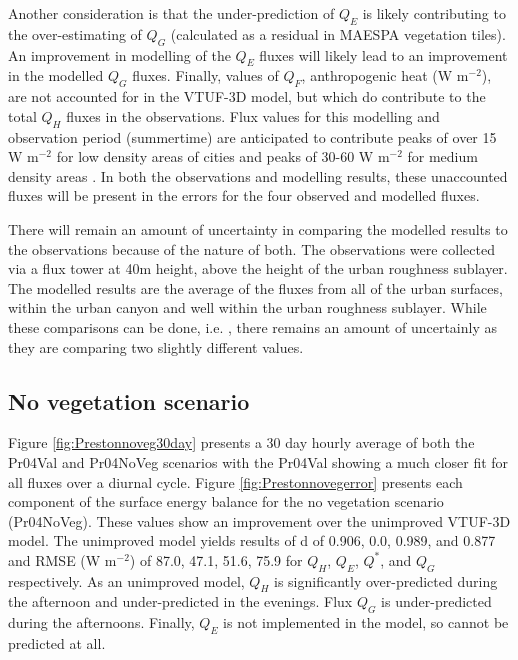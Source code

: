 \documentclass[final,3p,times,authoryear]{elsarticle}
\begin{document}
Another consideration is that the under-prediction of $Q_{E}$ is likely contributing to the over-estimating of $Q_{G}$ (calculated as a residual in MAESPA vegetation tiles). An improvement in modelling of the $Q_{E}$ fluxes will likely lead to an improvement in the modelled $Q_{G}$ fluxes. Finally, values of $Q_{F}$, anthropogenic heat (W m$^{-2}$), are not accounted for in the VTUF-3D model, but which do contribute to the total $Q_{H}$ fluxes in the observations. Flux values for this modelling and observation period (summertime) are anticipated to contribute peaks of over 15 W m$^{-2}$ for low density areas of cities and peaks of 30-60 W m$^{-2}$ for medium density areas \citep{Sailor2004}. In both the observations and modelling results, these unaccounted fluxes will be present in the errors for the four observed and modelled fluxes.

There will remain an amount of uncertainty in comparing the modelled results to the observations because of the nature of both. The observations were collected via a flux tower at 40m height, above the height of the urban roughness sublayer. The modelled results are the average of the fluxes from all of the urban surfaces, within the urban canyon and well within the urban roughness sublayer. While these comparisons can be done, i.e. \cite{Grimmond2011}, there remains an amount of uncertainly as they are comparing two slightly different values. 

\subsection{No vegetation scenario}\label{sec:baselinenoveg}

Figure \ref{fig:Prestonnoveg30day} presents a 30 day hourly average of both the Pr04Val and Pr04NoVeg scenarios with the Pr04Val showing a much closer fit for all fluxes over a diurnal cycle. Figure \ref{fig:Prestonnovegerror} presents each component of the surface energy balance for the no vegetation scenario (Pr04NoVeg). These values show an improvement over the unimproved VTUF-3D model. The unimproved model yields results of d of 0.906, 0.0, 0.989, and 0.877 and RMSE (W m$^{-2}$) of 87.0, 47.1, 51.6, 75.9 for $Q_{H}$, $Q_{E}$, $Q^{*}$, and $Q_{G}$ respectively. As an unimproved model, $Q_{H}$ is significantly over-predicted during the afternoon and under-predicted in the evenings. Flux $Q_{G}$ is under-predicted during the afternoons. Finally, $Q_{E}$ is not implemented in the model, so cannot be predicted at all. 
\end{document}
